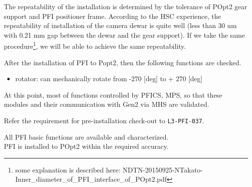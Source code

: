 The repeatability of the installation is determined by the tolerance of POpt2 gear support and PFI positioner frame.
According to the HSC experience, the repeatability of installation of the camera dewar is quite well (less than 30 um with 0.21 mm gap between the dewar and the gear support).
If we take the same procedure\footnote{some explanation is described here: NDTN-20150925-NTakato-Inner\_diameter\_of\_PFI\_interface\_of\_POpt2.pdf}, we will be able to achieve the same repeatability.

After the installation of PFI to Popt2, then the following functions are checked.
\begin{itemize}
\item rotator: can mechanically rotate from -270 [deg] to + 270 [deg]
\end{itemize}

At this point, most of functions controlled by PFICS, MPS, so that these modules and their communication with Gen2 via MHS are validated.

Refer the requirement for pre-installation check-out to {\tt L3-PFI-037}.

\begin{itembox}[l]{}
All PFI basic functions are available and characterized.\\
PFI is installed to POpt2 within the required accuracy. 

\end{itembox}